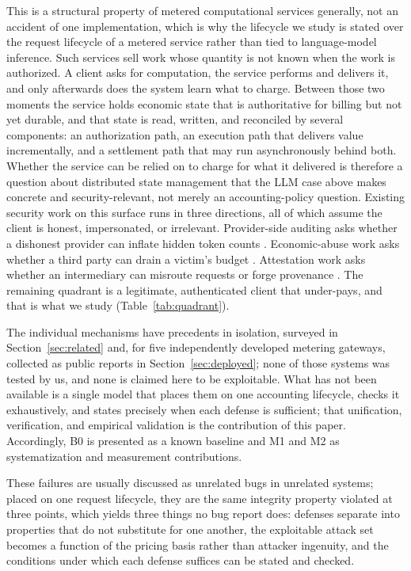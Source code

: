 \documentclass[manuscript,review,anonymous]{acmart}
\begin{document}
This is a structural property of metered computational services generally, not an
accident of one implementation, which is why the lifecycle we study is stated over the
request lifecycle of a metered service rather than tied to language-model inference.
Such services sell work whose quantity is not known when the work is
authorized. A client asks for computation, the service performs and delivers it, and only
afterwards does the system learn what to charge. Between those two moments the service
holds economic state that is authoritative for billing but not yet durable, and that
state is read, written, and reconciled by several components: an authorization path, an
execution path that delivers value incrementally, and a settlement path that may run
asynchronously behind both. Whether the service can be relied on to charge for what it
delivered is therefore a question about distributed state management that the LLM case
above makes concrete and security-relevant, not merely an accounting-policy question.
Existing security
work on this surface runs in three directions, all of which assume the client is honest,
impersonated, or irrelevant. Provider-side auditing asks whether a dishonest provider can
inflate hidden token counts \citep{coin,invisible,tokeninflation,ptia,auditingpaypertoken}. Economic-abuse work asks
whether a third party can drain a victim's budget \citep{dow,dowreview,owasp,llmjacking}.
Attestation work asks whether an intermediary can misroute requests or forge provenance
\citep{aex,gwprov}. The remaining quadrant is a legitimate, authenticated client that
under-pays, and that is what we study (Table~\ref{tab:quadrant}).

The individual mechanisms have precedents in isolation, surveyed in
Section~\ref{sec:related} and, for five independently developed metering gateways,
collected as public reports in Section~\ref{sec:deployed}; none of those systems was
tested by us, and none is claimed here to be exploitable. What has not been available is a
single model that places them on one accounting lifecycle, checks it exhaustively, and
states precisely when each defense is sufficient; that unification, verification, and
empirical validation is the contribution of this paper. Accordingly, B0 is presented as a
known baseline and M1 and M2 as systematization and measurement contributions.

These failures are usually discussed as unrelated bugs in unrelated systems; placed on one
request lifecycle, they are the same integrity property violated at three points, which
yields three things no bug report does: defenses separate into properties that do not
substitute for one another, the exploitable attack set becomes a function of the pricing
basis rather than attacker ingenuity, and the conditions under which each defense
suffices can be stated and checked.
\end{document}
